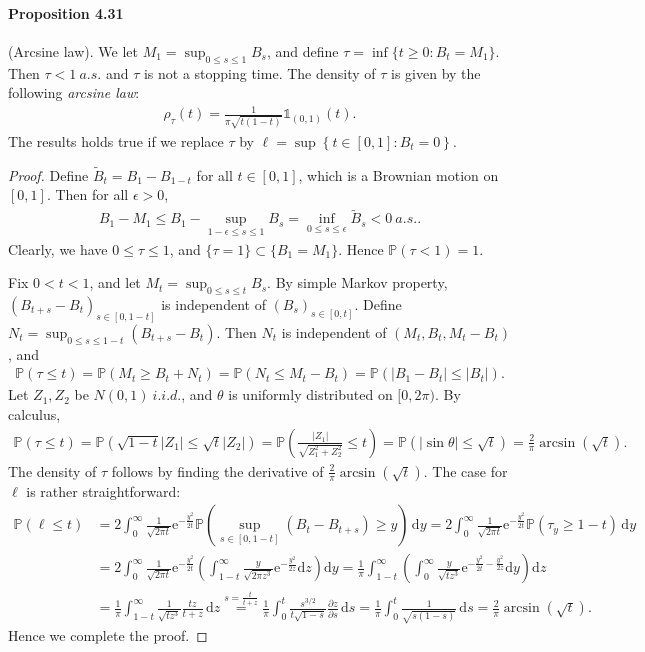 \documentclass{article}
\numberwithin{equation}{section}
\newcommand{\e}{\mathrm{e}}
\renewcommand{\P}{\mathbb{P}}
\renewcommand{\d}{\mathrm{d}}
\theoremstyle{plain}
\theoremstyle{definition}
\begin{document}
\paragraph{Proposition 4.31\label{prop:4.31}} (Arcsine law). We let $M_1=\sup_{0\leq s\leq 1}B_s$, and define $\tau=\inf\{t\geq 0:B_t=M_1\}$. Then $\tau<1\ a.s.$ and $\tau$ is not a stopping time. The density of $\tau$ is given by the following \textit{arcsine law}:
\begin{align*}
	\rho_\tau(t)=\frac{1}{\pi\sqrt{t(1-t)}}\mathds{1}_{(0,1)}(t).
\end{align*}
The results holds true if we replace $\tau$ by $\ell=\sup\left\{t\in[0,1]:B_t=0\right\}$.
\begin{proof}
Define $\widetilde{B}_t=B_1-B_{1-t}$ for all $t\in[0,1]$, which is a Brownian motion on $[0,1]$. Then for all $\epsilon>0$,
\begin{align*}
	B_1-M_1\leq B_1-\sup_{1-\epsilon\leq s\leq 1}B_s=\inf_{0\leq s\leq\epsilon}\widetilde{B}_s < 0\ a.s..
\end{align*}
Clearly, we have $0\leq\tau\leq 1$, and $\{\tau=1\}\subset\{B_1=M_1\}$. Hence $\P(\tau<1)=1$. 

Fix $0<t<1$, and let $M_t=\sup_{0\leq s\leq t}B_s$. By simple Markov property, $(B_{t+s}-B_t)_{s\in[0,1-t]}$ is independent of $(B_s)_{s\in[0,t]}$. Define $N_t=\sup_{0\leq s\leq 1-t}(B_{t+s}-B_t)$. Then $N_t$ is independent of $(M_t,B_t,M_t-B_t)$, and
\begin{align*}
	\P(\tau\leq t)=\P(M_t\geq B_t+N_t)=\P(N_t\leq M_t-B_t)=\P(\vert B_1-B_t\vert\leq\vert B_t\vert).
\end{align*}
Let $Z_1,Z_2$ be $N(0,1)\ i.i.d.$, and $\theta$ is uniformly distributed on $[0,2\pi)$. By calculus,
\begin{align*}
	\P(\tau\leq t)=\P\left(\sqrt{1-t}\vert Z_1\vert\leq\sqrt{t}\vert Z_2\vert\right)=\P\left(\frac{\vert Z_1\vert}{\sqrt{Z_1^2+Z_2^2}}\leq t\right)=\P\left(\vert\sin\theta\vert\leq\sqrt{t}\right)=\frac{2}{\pi}\arcsin(\sqrt{t}).
\end{align*}
The density of $\tau$ follows by finding the derivative of $\frac{2}{\pi}\arcsin(\sqrt{t})$. The case for $\ell$ is rather straightforward:
\begin{align*}
\P(\ell\leq t) &= 2\int_0^\infty\frac{1}{\sqrt{2\pi t}}\e^{-\frac{y^2}{2t}}\P\left(\sup_{s\in[0,1-t]}(B_t-B_{t+s})\geq y\right)\,\d y=2\int_0^\infty\frac{1}{\sqrt{2\pi t}}\e^{-\frac{y^2}{2t}}\P\left(\tau_y\geq 1-t\right)\,\d y\\
&=2\int_0^\infty\frac{1}{\sqrt{2\pi t}}\e^{-\frac{y^2}{2t}}\left(\int_{1-t}^\infty\frac{y}{\sqrt{2\pi z^3}}\e^{-\frac{y^2}{2z}}\d z\right)\d y = \frac{1}{\pi}\int_{1-t}^\infty\left(\int_0^\infty\frac{y}{\sqrt{tz^3}}\e^{-\frac{y^2}{2t}-\frac{y^2}{2z}}\d y\right)\d z\\
&=\frac{1}{\pi}\int_{1-t}^\infty\frac{1}{\sqrt{tz^3}}\frac{tz}{t+z}\,\d z \overset{s=\frac{t}{t+z}}{=}\frac{1}{\pi}\int_0^t\frac{s^{3/2}}{t\sqrt{1-s}}\frac{\partial z}{\partial s}\,\d s = \frac{1}{\pi}\int_0^t\frac{1}{\sqrt{s(1-s)}}\,\d s=\frac{2}{\pi}\arcsin(\sqrt{t}).
\end{align*}
Hence we complete the proof.
\end{proof}
\end{document}
